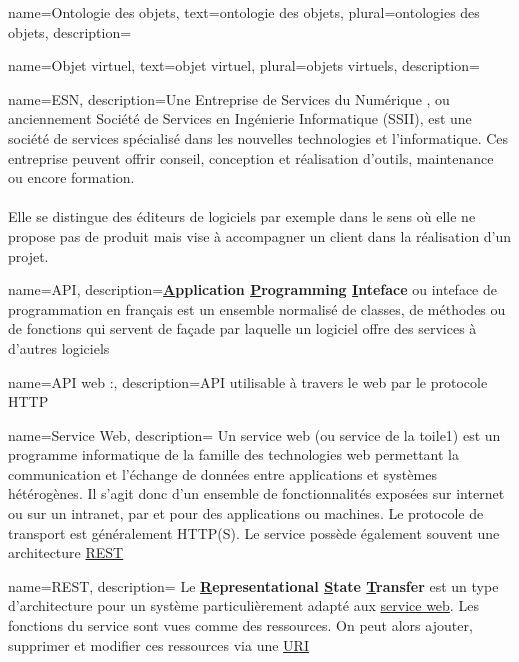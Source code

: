{
    name=Ontologie des objets,
    text=ontologie des objets,
    plural=ontologies des objets,
    description={}
}

{
    name=Objet virtuel,
    text=objet virtuel,
    plural=objets virtuels,
    description={}
}

{
	name=ESN,
    description={Une Entreprise de Services du Numérique , ou anciennement Société de Services en Ingénierie Informatique (SSII), est une société de services spécialisé dans les nouvelles technologies et l’informatique. Ces entreprise peuvent offrir conseil, conception et réalisation d’outils, maintenance ou encore formation.\\\\
    Elle se distingue des éditeurs de logiciels par exemple dans le sens où elle ne propose pas de produit mais vise à accompagner un client dans la réalisation d'un projet.}
}

{
    name=API,
    description={\textbf{\underline{A}pplication \underline{P}rogramming \underline{I}nteface} ou inteface de programmation en français est un ensemble normalisé de classes, de méthodes ou de fonctions qui servent de façade par laquelle un logiciel offre des services à d'autres logiciels}
}

{
    name=API web :,
    description={\gls{API} utilisable à travers le web par le protocole HTTP}
}

{
    name=Service Web,
    description=
    {
        Un service web (ou service de la toile1) est un programme informatique de la famille des technologies web permettant la communication et l'échange de données entre applications et systèmes hétérogènes.
        Il s'agit donc d'un ensemble de fonctionnalités exposées sur internet ou sur un intranet, par et pour des applications ou machines.
        Le protocole de transport est généralement HTTP(S). Le service possède également souvent une architecture \underline{\gls{REST}}
    }
}

{
    name=REST,
    description=
    {
        Le \textbf{\underline{R}epresentational \underline{S}tate \underline{T}ransfer} est un type d'architecture pour un système particulièrement adapté aux \underline{\gls{service web}}. Les fonctions du service sont vues comme des ressources. On peut alors ajouter, supprimer et modifier ces ressources via une \underline{\gls{URI}}
    }
}

